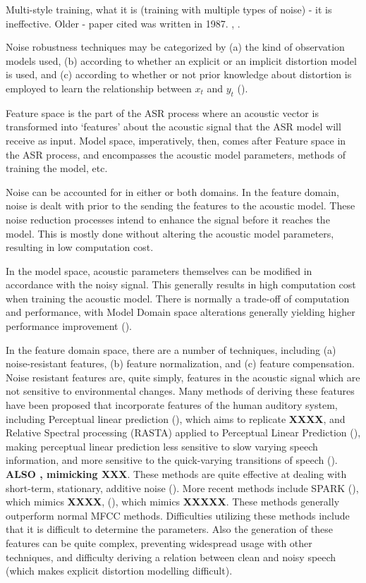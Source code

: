 \documentclass[dissertation,copyright]{uathesis}
\begin{document}
Multi-style training, what it is (training with multiple types of noise) - it is ineffective.  Older - paper cited was written in 1987. \cite{li:14}, \cite{lippmann:87}.

Noise robustness techniques may be categorized by (a) the kind of observation models used, (b) according to whether an explicit or an implicit distortion model is used, and (c) according to whether or not prior knowledge about distortion is employed to learn the relationship between $x_\textit{t}$ and $y_\textit{t}$ (\cite{li:14}).


Feature space is the part of the ASR process where an acoustic vector is transformed into `features' about the acoustic signal that the ASR model will receive as input.  Model space, imperatively, then, comes after Feature space in the ASR process, and encompasses the acoustic model parameters, methods of training the model, etc.

Noise can be accounted for in either or both domains.  In the feature domain, noise is dealt with prior to the sending the features to the acoustic model.  These noise reduction processes intend to enhance the signal before it reaches the model.  This is mostly done without altering the acoustic model parameters, resulting in low computation cost.

In the model space, acoustic parameters themselves can be modified in accordance with the noisy signal.  This generally results in high computation cost when training the acoustic model.  There is normally a trade-off of computation and performance, with Model Domain space alterations generally yielding higher performance improvement (\cite{li:14}).

In the feature domain space, there are a number of techniques, including (a) noise-resistant features, (b) feature normalization, and  (c) feature compensation.  Noise resistant features are, quite simply, features in the acoustic signal which are not sensitive to environmental changes.  Many methods of deriving these features have been proposed that incorporate features of the human auditory system, including Perceptual linear prediction (\cite{hermansky:85}), which aims to replicate \textbf{XXXX}, and Relative Spectral processing (RASTA) applied to Perceptual Linear Prediction (\cite{hermansky:92}), making perceptual linear prediction less sensitive to slow varying speech information, and more sensitive to the quick-varying transitions of speech (\cite{story:10}).  \textbf{ALSO \cite{kim:99}, mimicking XXX}. These methods are quite effective at dealing with short-term, stationary, additive noise (\cite{zhang:17}).  More recent methods include SPARK (\cite{fazel:12}), which mimics \textbf{XXXX}, (\cite{moritz:15}), which mimics \textbf{XXXXX}.  These methods generally outperform normal MFCC methods. Difficulties utilizing these methods include that it is difficult to determine the parameters.  Also the generation of these features can be quite complex, preventing widespread usage with other techniques, and difficulty deriving a relation between clean and noisy speech (which makes explicit distortion modelling difficult).
\end{document}
